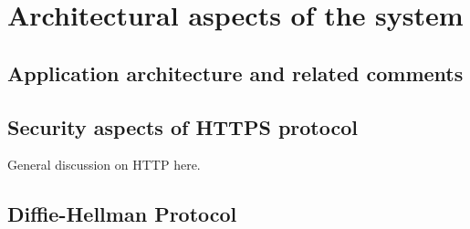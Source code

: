 \chapter{Architectural aspects of the system}\label{ch:architectural-aspects-of-the-system}


\section{Application architecture and related comments}\label{sec:application-architecture-and-related-comments}



\section{Security aspects of HTTPS protocol}\label{sec:security-aspects-of-https-protocol}
General discussion on HTTP here.


\section{Diffie-Hellman Protocol}\label{sec:diffie-hellman-protocol}
